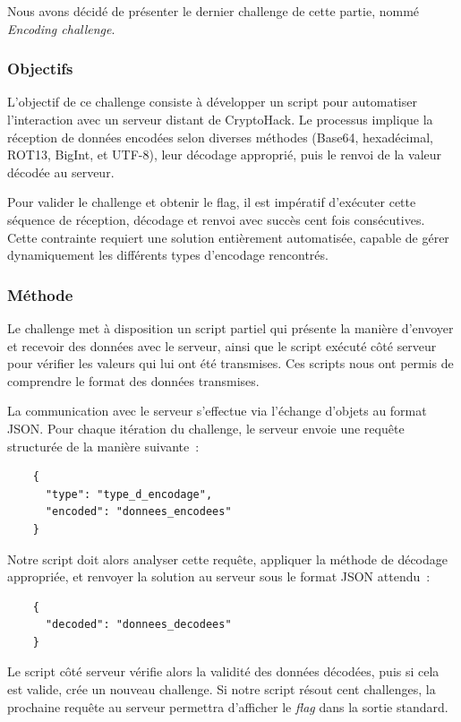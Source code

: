 \documentclass[12pt, a4paper]{article}
\begin{document}
    Nous avons décidé de présenter le dernier challenge de cette partie, nommé
    \textit{Encoding challenge}.

    \subsubsection{Objectifs}
    L'objectif de ce challenge consiste à développer un script pour automatiser
    l'interaction avec un serveur distant de CryptoHack. Le processus implique
    la réception de données encodées selon diverses méthodes (Base64,
    hexadécimal, ROT13, BigInt, et UTF-8), leur décodage approprié, puis le
    renvoi de la valeur décodée au serveur.

    Pour valider le challenge et obtenir le flag, il est impératif d'exécuter
    cette séquence de réception, décodage et renvoi avec succès cent fois
    consécutives. Cette contrainte requiert une solution entièrement
    automatisée, capable de gérer dynamiquement les différents types
    d'encodage rencontrés.

    \subsubsection{Méthode}
    Le challenge met à disposition un script partiel qui présente la manière
    d'envoyer et recevoir des données avec le serveur, ainsi que le script
    exécuté côté serveur pour vérifier les valeurs qui lui ont été transmises.
    Ces scripts nous ont permis de comprendre le format des données transmises.

    La communication avec le serveur s'effectue via l'échange d'objets au format
    JSON. Pour chaque itération du challenge, le serveur envoie une requête
    structurée de la manière suivante~:

    \begin{verbatim}
    {
      "type": "type_d_encodage",
      "encoded": "donnees_encodees"
    }
    \end{verbatim}

    Notre script doit alors analyser cette requête, appliquer la méthode de
    décodage appropriée, et renvoyer la solution au serveur sous le format JSON
    attendu~:

    \begin{verbatim}
    {
      "decoded": "donnees_decodees"
    }
    \end{verbatim}

    Le script côté serveur vérifie alors la validité des données décodées, puis
    si cela est valide, crée un nouveau challenge. Si notre script résout cent
    challenges, la prochaine requête au serveur permettra d'afficher le
    \textit{flag} dans la sortie standard.
\end{document}
